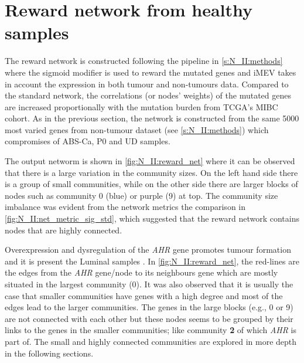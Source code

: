 \section{Reward network from healthy samples} \label{s:N_II:rwd}

\vspace{3mm}
\vspace{3mm}

The reward network is constructed following the pipeline in \cref{s:N_II:methods} where the sigmoid modifier is used to reward the mutated genes and iMEV takes in account the expression in both tumour and non-tumours data. Compared to the standard network, the correlations (or nodes' weights) of the mutated genes are increased proportionally with the mutation burden from TCGA's MIBC cohort. As in the previous section, the network is constructed from the same 5000 most varied genes from non-tumour dataset (see \cref{s:N_II:methods}) which compromises of ABS-Ca, P0 and UD samples.

The output networm is shown in \cref{fig:N_II:reward_net} where it can be observed that there  is a large variation in the community sizes. On the left hand side there is a group of small communities, while on the other side there are larger blocks of nodes such as community 0 (blue) or purple (9) at top. The community size imbalance was evident from the network metrics the comparison in \cref{fig:N_II:net_metric_sig_std}, which suggested that the reward network contains nodes that are highly connected.

Overexpression and dysregulation of the \textit{AHR} gene promotes tumour formation and it is present the Luminal samples \citep{Shi2020-km}. In \cref{fig:N_II:reward_net}, the red-lines are the edges from the \textit{AHR} gene/node to its neighbours gene which are mostly situated in the largest community (0).  It was also observed that it is usually the case that smaller communities have genes with a high degree and most of the edges lead to the larger communities. The genes in the large blocks (e.g., 0 or 9) are not connected with each other but these nodes seems to be grouped by their links to the genes in the smaller communities; like community \textbf{2} of which \textit{AHR} is part of. The small and highly connected communities are explored in more depth in the following sections.

